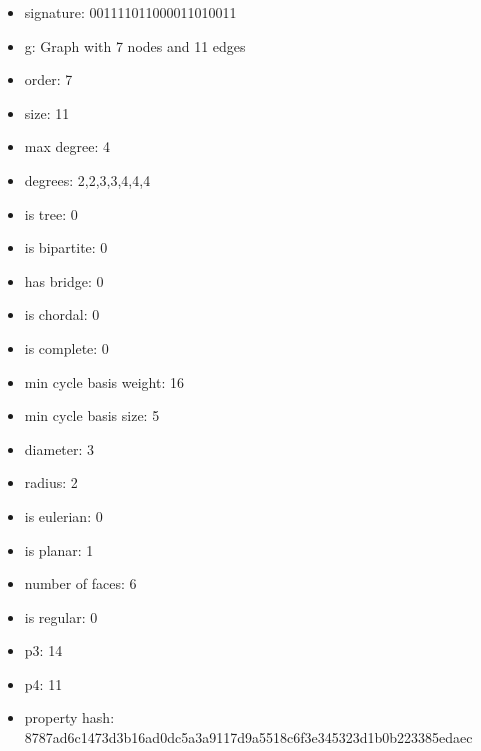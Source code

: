 \begin{itemize}
\item signature: 001111011000011010011
\item g: Graph with 7 nodes and 11 edges
\item order: 7
\item size: 11
\item max degree: 4
\item degrees: 2,2,3,3,4,4,4
\item is tree: 0
\item is bipartite: 0
\item has bridge: 0
\item is chordal: 0
\item is complete: 0
\item min cycle basis weight: 16
\item min cycle basis size: 5
\item diameter: 3
\item radius: 2
\item is eulerian: 0
\item is planar: 1
\item number of faces: 6
\item is regular: 0
\item p3: 14
\item p4: 11
\item property hash: 8787ad6c1473d3b16ad0dc5a3a9117d9a5518c6f3e345323d1b0b223385edaec
\end{itemize}
\newpage
\begin{figure}
\end{figure}
